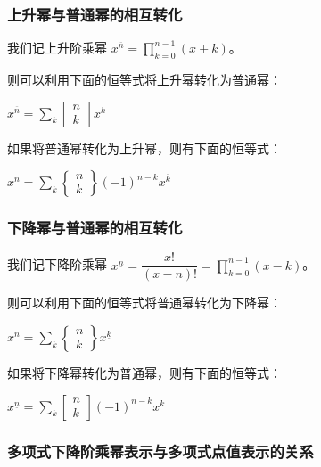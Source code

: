 \documentclass[]{article}
\begin{document}
\hypertarget{ux4e0aux5347ux5e42ux4e0eux666eux901aux5e42ux7684ux76f8ux4e92ux8f6cux5316}{%
\subsubsection{上升幂与普通幂的相互转化}\label{ux4e0aux5347ux5e42ux4e0eux666eux901aux5e42ux7684ux76f8ux4e92ux8f6cux5316}}

我们记上升阶乘幂 \(x^{\overline{n}}=\prod_{k=0}^{n-1} (x+k)\)。

则可以利用下面的恒等式将上升幂转化为普通幂：

\(x^{\overline{n}}=\sum_{k} \begin{bmatrix}n\\ k\end{bmatrix} x^k\)

如果将普通幂转化为上升幂，则有下面的恒等式：

\(x^n=\sum_{k} \begin{Bmatrix}n\\ k\end{Bmatrix} (-1)^{n-k} x^{\overline{k}}\)

\hypertarget{ux4e0bux964dux5e42ux4e0eux666eux901aux5e42ux7684ux76f8ux4e92ux8f6cux5316}{%
\subsubsection{下降幂与普通幂的相互转化}\label{ux4e0bux964dux5e42ux4e0eux666eux901aux5e42ux7684ux76f8ux4e92ux8f6cux5316}}

我们记下降阶乘幂
\(x^{\underline{n}}=\dfrac{x!}{(x-n)!}=\prod_{k=0}^{n-1} (x-k)\)。

则可以利用下面的恒等式将普通幂转化为下降幂：

\(x^n=\sum_{k} \begin{Bmatrix}n\\ k\end{Bmatrix} x^{\underline{k}}\)

如果将下降幂转化为普通幂，则有下面的恒等式：

\(x^{\underline{n}}=\sum_{k} \begin{bmatrix}n\\ k\end{bmatrix} (-1)^{n-k} x^k\)

\hypertarget{ux591aux9879ux5f0fux4e0bux964dux9636ux4e58ux5e42ux8868ux793aux4e0eux591aux9879ux5f0fux70b9ux503cux8868ux793aux7684ux5173ux7cfb}{%
\subsubsection{多项式下降阶乘幂表示与多项式点值表示的关系}\label{ux591aux9879ux5f0fux4e0bux964dux9636ux4e58ux5e42ux8868ux793aux4e0eux591aux9879ux5f0fux70b9ux503cux8868ux793aux7684ux5173ux7cfb}}
\end{document}
